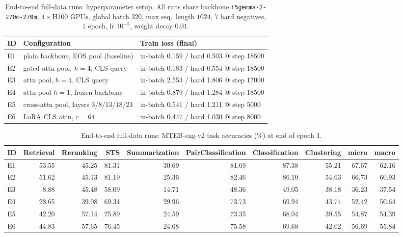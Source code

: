 
\begin{table}[ht]
\centering
\small
\setlength{\tabcolsep}{4pt}
\caption{End-to-end full-data runs: hyperparameter setup. All runs share backbone \texttt{t5gemma-2-270m-270m}, $4{\times}$H100 GPUs, global batch $320$, max seq.\ length $1024$, $7$ hard negatives, $1$ epoch, lr $10^{-5}$, weight decay $0.01$.}
\label{tab:e2e-hparams}
\begin{tabular}{lll}
\toprule
ID & Configuration & Train loss (final) \\
\midrule
E1 & plain backbone, EOS pool (baseline) & in-batch 0.159 / hard 0.503 @ step 18500 \\
E2 & gated attn pool, $h{=}4$, CLS query & in-batch 0.183 / hard 0.554 @ step 18500 \\
E3 & attn pool, $h{=}4$, CLS query & in-batch 2.553 / hard 1.806 @ step 17000 \\
E4 & attn pool $h{=}1$, frozen backbone & in-batch 0.879 / hard 1.284 @ step 18500 \\
E5 & cross-attn pool, layers 3/8/13/18/23 & in-batch 0.541 / hard 1.211 @ step 5000 \\
E6 & LoRA CLS attn, $r{=}64$ & in-batch 0.447 / hard 1.030 @ step 8000 \\
\bottomrule
\end{tabular}
\end{table}

\begin{table}[ht]
\centering
\small
\setlength{\tabcolsep}{4pt}
\caption{End-to-end full-data runs: MTEB-eng-v2 task accuracies (\%) at end of epoch 1.}
\label{tab:e2e-perf}
\begin{tabular}{lrrrrrrrrr}
\toprule
ID & Retrieval & Reranking & STS & Summarization & PairClassification & Classification & Clustering & micro & macro \\
\midrule
E1 & 53.55 & 45.25 & 81.31 & 30.69 & 81.69 & 87.38 & 55.21 & 67.67 & 62.16 \\
E2 & 51.62 & 45.13 & 81.19 & 25.36 & 82.46 & 86.10 & 54.63 & 66.73 & 60.93 \\
E3 & 8.88 & 45.48 & 58.09 & 14.71 & 48.36 & 49.05 & 38.18 & 36.23 & 37.54 \\
E4 & 28.65 & 39.08 & 69.34 & 29.96 & 73.73 & 69.94 & 43.74 & 52.42 & 50.64 \\
E5 & 42.20 & 57.14 & 75.89 & 24.59 & 73.35 & 68.04 & 39.55 & 54.87 & 54.39 \\
E6 & 44.83 & 57.65 & 76.45 & 24.68 & 75.58 & 69.68 & 42.02 & 56.69 & 55.84 \\
\bottomrule
\end{tabular}
\end{table}


